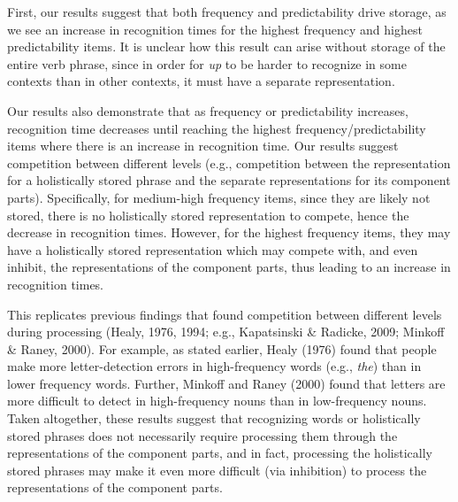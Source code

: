 \documentclass[
  man,floatsintext]{apa6}
\begin{document}
First, our results suggest that both frequency and predictability drive storage, as we see an increase in recognition times for the highest frequency and highest predictability items. It is unclear how this result can arise without storage of the entire verb phrase, since in order for \emph{up} to be harder to recognize in some contexts than in other contexts, it must have a separate representation.

Our results also demonstrate that as frequency or predictability increases, recognition time decreases until reaching the highest frequency/predictability items where there is an increase in recognition time. Our results suggest competition between different levels (e.g., competition between the representation for a holistically stored phrase and the separate representations for its component parts). Specifically, for medium-high frequency items, since they are likely not stored, there is no holistically stored representation to compete, hence the decrease in recognition times. However, for the highest frequency items, they may have a holistically stored representation which may compete with, and even inhibit, the representations of the component parts, thus leading to an increase in recognition times.

This replicates previous findings that found competition between different levels during processing (Healy, 1976, 1994; e.g., Kapatsinski \& Radicke, 2009; Minkoff \& Raney, 2000). For example, as stated earlier, Healy (1976) found that people make more letter-detection errors in high-frequency words (e.g., \emph{the}) than in lower frequency words. Further, Minkoff and Raney (2000) found that letters are more difficult to detect in high-frequency nouns than in low-frequency nouns. Taken altogether, these results suggest that recognizing words or holistically stored phrases does not necessarily require processing them through the representations of the component parts, and in fact, processing the holistically stored phrases may make it even more difficult (via inhibition) to process the representations of the component parts.
\end{document}
